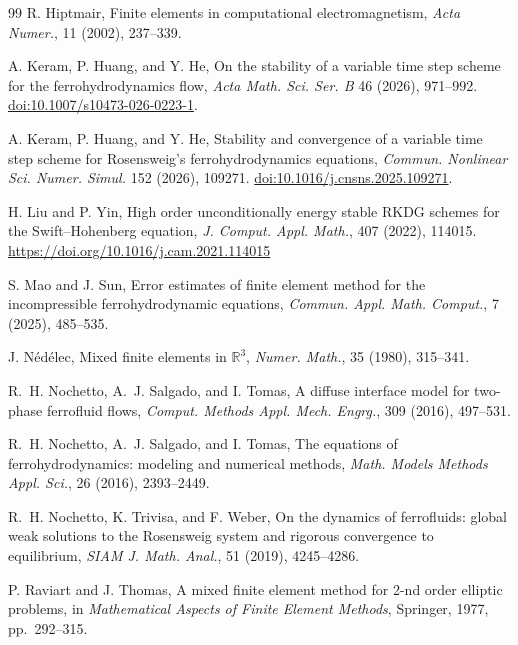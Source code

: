 \documentclass[11pt,a4paper]{article}
\newif\ifmarkchanges
\newcommand{\rev}[1]{{\ifmarkchanges\color{blue}\fi#1}}
\theoremstyle{definition}
\numberwithin{equation}{section}
\begin{document}
\begin{thebibliography}{99}
R. Hiptmair, Finite elements in computational electromagnetism,
\emph{Acta Numer.}, 11 (2002), 237--339.


A. Keram, P. Huang, and Y. He, On the stability of a variable time step scheme for the ferrohydrodynamics flow, \emph{Acta Math. Sci. Ser. B} 46 (2026), 971--992. \href{https://doi.org/10.1007/s10473-026-0223-1}{doi:10.1007/s10473-026-0223-1}.

A. Keram, P. Huang, and Y. He, Stability and convergence of a variable time step scheme for Rosensweig's ferrohydrodynamics equations, \emph{Commun. Nonlinear Sci. Numer. Simul.} 152 (2026), 109271. \href{https://doi.org/10.1016/j.cnsns.2025.109271}{doi:10.1016/j.cnsns.2025.109271}.

H. Liu and P. Yin,
High order unconditionally energy stable RKDG schemes for the
Swift--Hohenberg equation,
\emph{J. Comput. Appl. Math.}, 407 (2022), 114015.
\url{https://doi.org/10.1016/j.cam.2021.114015}

S. Mao and J. Sun,
Error estimates of finite element method for the incompressible ferrohydrodynamic equations,
\emph{Commun. Appl. Math. Comput.}, 7 (2025), 485--535.

J. N\'ed\'elec,
Mixed finite elements in $\mathbb R^3$,
\emph{Numer. Math.}, 35 (1980), 315--341.

R.~H. Nochetto, A.~J. Salgado, and I. Tomas,
A diffuse interface model for two-phase ferrofluid flows,
\emph{Comput. Methods Appl. Mech. Engrg.}, 309 (2016), 497--531.

R.~H. Nochetto, A.~J. Salgado, and I. Tomas,
The equations of ferrohydrodynamics: modeling and numerical methods,
\emph{Math. Models Methods Appl. Sci.}, 26 (2016), 2393--2449.

R.~H. Nochetto, K. Trivisa, and F. Weber,
On the dynamics of ferrofluids: global weak solutions to the Rosensweig system and rigorous convergence to equilibrium,
\emph{SIAM J. Math. Anal.}, 51 (2019), 4245--4286.

P. Raviart and J. Thomas,
A mixed finite element method for 2-nd order elliptic problems,
in \emph{Mathematical Aspects of Finite Element Methods}, Springer, 1977, pp.~292--315.


\end{thebibliography}
\end{document}
